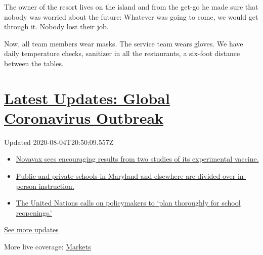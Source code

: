 The owner of the resort lives on the island and from the get-go he made
sure that nobody was worried about the future: Whatever was going to
come, we would get through it. Nobody lost their job.

Now, all team members wear masks. The service team wears gloves. We have
daily temperature checks, sanitizer in all the restaurants, a six-foot
distance between the tables.

\hypertarget{latest-updates-global-coronavirus-outbreak}{%
\section{\texorpdfstring{\href{https://www.nytimes3xbfgragh.onion/2020/08/04/world/coronavirus-cases.html?action=click\&pgtype=Article\&state=default\&region=MAIN_CONTENT_1\&context=storylines_live_updates}{Latest
Updates: Global Coronavirus
Outbreak}}{Latest Updates: Global Coronavirus Outbreak}}\label{latest-updates-global-coronavirus-outbreak}}

Updated 2020-08-04T20:50:09.557Z

\begin{itemize}
\tightlist
\item
  \href{https://www.nytimes3xbfgragh.onion/2020/08/04/world/coronavirus-cases.html?action=click\&pgtype=Article\&state=default\&region=MAIN_CONTENT_1\&context=storylines_live_updates\#link-1228a480}{Novavax
  sees encouraging results from two studies of its experimental
  vaccine.}
\item
  \href{https://www.nytimes3xbfgragh.onion/2020/08/04/world/coronavirus-cases.html?action=click\&pgtype=Article\&state=default\&region=MAIN_CONTENT_1\&context=storylines_live_updates\#link-4825b93}{Public
  and private schools in Maryland and elsewhere are divided over
  in-person instruction.}
\item
  \href{https://www.nytimes3xbfgragh.onion/2020/08/04/world/coronavirus-cases.html?action=click\&pgtype=Article\&state=default\&region=MAIN_CONTENT_1\&context=storylines_live_updates\#link-50f7386d}{The
  United Nations calls on policymakers to `plan thoroughly for school
  reopenings.'}
\end{itemize}

\href{https://www.nytimes3xbfgragh.onion/2020/08/04/world/coronavirus-cases.html?action=click\&pgtype=Article\&state=default\&region=MAIN_CONTENT_1\&context=storylines_live_updates}{See
more updates}

More live coverage:
\href{https://www.nytimes3xbfgragh.onion/live/2020/08/04/business/stock-market-today-coronavirus?action=click\&pgtype=Article\&state=default\&region=MAIN_CONTENT_1\&context=storylines_live_updates}{Markets}

